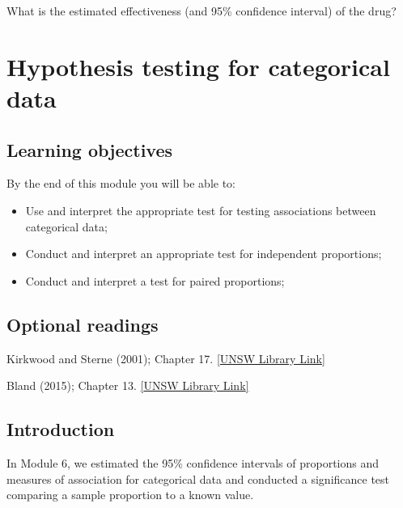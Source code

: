 \documentclass[
  a4paper,
]{memoir}
\providecommand{\tightlist}{%
  \setlength{\itemsep}{0pt}\setlength{\parskip}{0pt}}
\begin{document}
What is the estimated effectiveness (and 95\% confidence interval) of
the drug?


\chapter{Hypothesis testing for categorical
data}\label{hypothesis-testing-for-categorical-data}

\section*{Learning objectives}\label{learning-objectives-6}


By the end of this module you will be able to:

\begin{itemize}
\tightlist
\item
  Use and interpret the appropriate test for testing associations
  between categorical data;
\item
  Conduct and interpret an appropriate test for independent proportions;
\item
  Conduct and interpret a test for paired proportions;
\end{itemize}

\section*{Optional readings}\label{optional-readings-6}


Kirkwood and Sterne (2001); Chapter 17.
\href{http://er1.library.unsw.edu.au/er/cgi-bin/eraccess.cgi?url=https://ebookcentral.proquest.com/lib/unsw/detail.action?docID=624728}{{[}UNSW
Library Link{]}}

Bland (2015); Chapter 13.
\href{http://er1.library.unsw.edu.au/er/cgi-bin/eraccess.cgi?url=https://ebookcentral.proquest.com/lib/unsw/detail.action?docID=5891730}{{[}UNSW
Library Link{]}}

\section{Introduction}\label{introduction-6}

In Module 6, we estimated the 95\% confidence intervals of proportions
and measures of association for categorical data and conducted a
significance test comparing a sample proportion to a known value.
\end{document}
